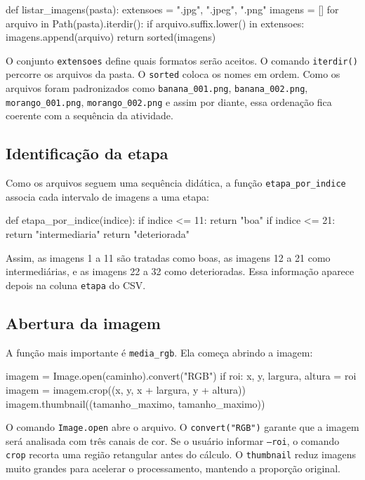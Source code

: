 \documentclass[12pt]{article}
\begin{document}
\begin{codebox}
def listar_imagens(pasta):
    extensoes = {".jpg", ".jpeg", ".png"}
    imagens = []
    for arquivo in Path(pasta).iterdir():
        if arquivo.suffix.lower() in extensoes:
            imagens.append(arquivo)
    return sorted(imagens)
\end{codebox}

O conjunto \texttt{extensoes} define quais formatos serão aceitos. O comando \texttt{iterdir()} percorre os arquivos da pasta. O \texttt{sorted} coloca os nomes em ordem. Como os arquivos foram padronizados como \texttt{banana\_001.png}, \texttt{banana\_002.png}, \texttt{morango\_001.png}, \texttt{morango\_002.png} e assim por diante, essa ordenação fica coerente com a sequência da atividade.

\subsection{Identificação da etapa}

Como os arquivos seguem uma sequência didática, a função \texttt{etapa\_por\_indice} associa cada intervalo de imagens a uma etapa:

\begin{codebox}
def etapa_por_indice(indice):
    if indice <= 11:
        return "boa"
    if indice <= 21:
        return "intermediaria"
    return "deteriorada"
\end{codebox}

Assim, as imagens 1 a 11 são tratadas como boas, as imagens 12 a 21 como intermediárias, e as imagens 22 a 32 como deterioradas. Essa informação aparece depois na coluna \texttt{etapa} do CSV.

\subsection{Abertura da imagem}

A função mais importante é \texttt{media\_rgb}. Ela começa abrindo a imagem:

\begin{codebox}
imagem = Image.open(caminho).convert("RGB")
if roi:
    x, y, largura, altura = roi
    imagem = imagem.crop((x, y, x + largura, y + altura))
imagem.thumbnail((tamanho_maximo, tamanho_maximo))
\end{codebox}

O comando \texttt{Image.open} abre o arquivo. O \texttt{convert("RGB")} garante que a imagem será analisada com três canais de cor. Se o usuário informar \texttt{--roi}, o comando \texttt{crop} recorta uma região retangular antes do cálculo. O \texttt{thumbnail} reduz imagens muito grandes para acelerar o processamento, mantendo a proporção original.
\end{document}
